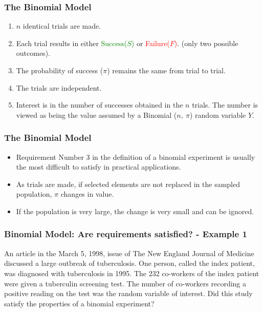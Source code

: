 \documentclass[xcolor=dvipsnames,12pt]{beamer}
\begin{document}
\begin{frame}
\frametitle{The Binomial Model}
\begin{enumerate}
\item $n$ identical trials are made. 
\item Each trial results in either \textcolor{green}{Success($S$)} or
      \textcolor{red}{Failure($F$)}.  (only two possible outcomes).
\item The probability of success ($\pi$) remains the
      same from trial to trial.
\item The trials are independent.
\item Interest is in the number of successes obtained in the
      $n$ trials.  The number is viewed as being the value 
      assumed by a Binomial ($n,\ \pi$) random variable $Y$.
\end{enumerate}
\end{frame}


\begin{frame}
\frametitle{The Binomial Model}
\begin{itemize}
\item Requirement Number 3 in the definition of a binomial experiment
is usually the most difficult to satisfy in practical applications.
\item As trials are made, if selected elements are not replaced in the
sampled population, $\pi$ changes in value.
\item  If the population is
very large, the change is very small and can be ignored.
\end{itemize}
\end{frame}

\begin{frame}
\frametitle{Binomial Model: Are requirements satisfied? - Example 1}
An article in the March 5, 1998, issue of The New England Journal of Medicine discussed a large outbreak of tuberculosis. One person, called the index patient, was diagnosed with tuberculosis in 1995. The 232 co-workers of the index patient were given a tuberculin screening test. The number of co-workers recording a positive reading on the test was the random variable of interest. Did this study satisfy the properties of a binomial experiment?
\end{frame}
\end{document}
